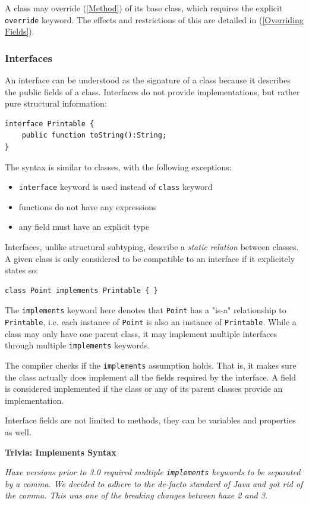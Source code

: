 \documentclass{article}
\newcommand{\type}[1]{\texttt{#1}}
\newcommand{\expr}[1]{\texttt{#1}}
\newenvironment{myshaded}
  {\def\FrameCommand{\fboxsep=\topsep\colorbox{bgcolor}}%
  \MakeFramed {\advance\hsize-\width \FrameRestore}}%
 {\endMakeFramed}
\newcommand{\trivia}[2]
	{\begin{myshaded}\noindent\textbf{Trivia: #1}\par\nobreak\noindent\ignorespaces\textit{#2}\end{myshaded}}
\newcommand{\fullref}[1]{\nameref{#1} (\cref{#1})}
\begin{document}
A class may override \fullref{Method} of its base class, which requires the explicit \expr{override} keyword. The effects and restrictions of this are detailed in \fullref{Overriding Fields}.


\subsubsection{Interfaces}
\label{Interfaces}

An interface can be understood as the signature of a class because it describes the public fields of a class. Interfaces do not provide implementations, but rather pure structural information:

\begin{lstlisting}
interface Printable {
	public function toString():String;
}
\end{lstlisting}
The syntax is similar to classes, with the following exceptions:

\begin{itemize}
	\item \expr{interface} keyword is used instead of \expr{class} keyword
	\item functions do not have any expressions
	\item any field must have an explicit type
\end{itemize}
Interfaces, unlike structural subtyping, describe a \emph{static relation} between classes. A given class is only considered to be compatible to an interface if it explicitely states so:

\begin{lstlisting}
class Point implements Printable { }
\end{lstlisting}
The \expr{implements} keyword here denotes that \type{Point} has a "is-a" relationship to \type{Printable}, i.e. each instance of \type{Point} is also an instance of \type{Printable}. While a class may only have one parent class, it may implement multiple interfaces through multiple \expr{implements} keywords.

The compiler checks if the \expr{implements} assumption holds. That is, it makes sure the class actually does implement all the fields required by the interface. A field is considered implemented if the class or any of its parent classes provide an implementation.

Interface fields are not limited to methods, they can be variables and properties as well.

\trivia{Implements Syntax}{Haxe versions prior to 3.0 required multiple \expr{implements} keywords to be separated by a comma. We decided to adhere to the de-facto standard of Java and got rid of the comma. This was one of the breaking changes between haxe 2 and 3.}
\end{document}
